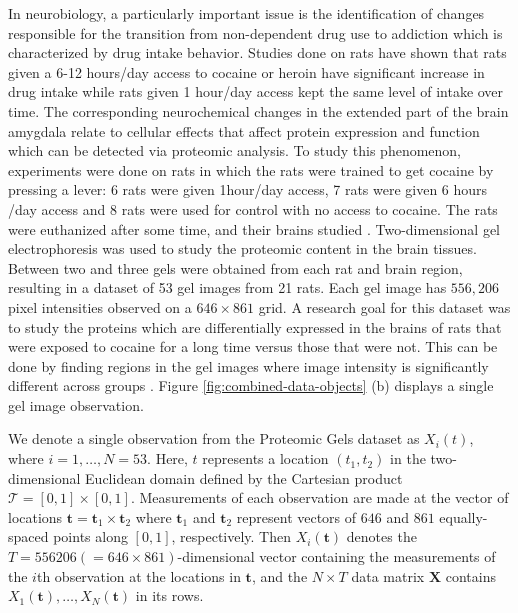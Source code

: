 In neurobiology, a particularly important issue is the identification of changes responsible for the transition from non-dependent drug use to addiction which is characterized by drug intake behavior. Studies done on rats have shown that rats given a 6-12 hours/day access to cocaine or heroin have significant increase in drug intake while rats given 1 hour/day access kept the same level of intake over time.
The corresponding neurochemical changes in the extended part of the brain amygdala relate to cellular effects that affect protein expression and function which can be detected via proteomic analysis. To study this phenomenon, experiments were done on rats in which the rats were trained to get cocaine by pressing a lever: 6 rats were given 1hour/day access, 7 rats were given 6 hours /day access and 8 rats were used for control with no access to cocaine. The rats were euthanized after some time, and their brains studied \parencite{morris_pinnacle_2008}. 
Two-dimensional gel electrophoresis was used to study the proteomic content in the brain tissues. 
Between two and three gels were obtained from each rat and brain region, resulting in a dataset of 53 gel images from 21 rats.
Each gel image has $556,206$ pixel intensities observed on a $646 \times 861$ grid. 
A research goal for this dataset was to study the proteins which are differentially expressed in the brains of rats that were exposed to cocaine for a long time versus those that were not.
This can be done by finding regions in the gel images where image intensity is significantly different across groups \parencite{morris_statistical_2012}. 
Figure \ref{fig:combined-data-objects} (b) displays a single gel image observation.

We denote a single observation from the Proteomic Gels dataset as $X_i(t)$, where $i=1, \dots, N = 53$.
Here, $t$ represents a location $(t_1, t_2)$ in the two-dimensional Euclidean domain defined by the Cartesian product $\mathcal{T} = [0, 1] \times [0, 1]$.
Measurements of each observation are made at the vector of locations $\mathbf{t} = \mathbf{t}_1 \times \mathbf{t}_2$ where $\mathbf{t}_1$ and $\mathbf{t}_2$ represent vectors of $646$ and $861$ equally-spaced points along $[0, 1]$, respectively.
Then $X_i (\mathbf{t})$ denotes the $T = 556206 ( = 646 \times 861)$-dimensional vector containing the measurements of the $i$th observation at the locations in $\mathbf{t}$, and the $N \times T$ data matrix $\mathbf{X}$ contains $X_1 (\mathbf{t}), \dots, X_N (\mathbf{t})$ in its rows.

